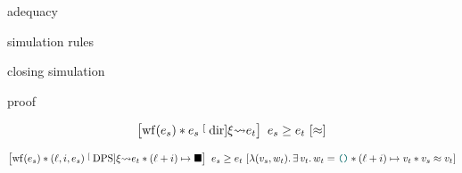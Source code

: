
adequacy



simulation rules





%

closing simulation

proof


\begin{theorem}
    \[
        \iCsimvHoare{
            \wf{e_s} \iSep
            e_s \tmcDir{\xi} e_t
        }{
            \iSimilar
        }{
            e_s
        }{
            e_t
        }
    \]
\end{theorem}

\begin{theorem}
    \[
        \iCsimvHoare{
            \wf{e_s} \iSep
            (\loc, i, e_s) \tmcDps{\xi} e_t \iSep
            (\loc + i) \mapsto \lambdHole
        }{
            \lambdaAbs (v_s, w_t) \ldotp
            \exists v_t \ldotp
            w_t = \lambdUnit \iSep
            (\loc + i) \mapsto v_t \iSep
            v_s \iSimilar v_t
        }{
            e_s
        }{
            e_t
        }
    \]
\end{theorem}

